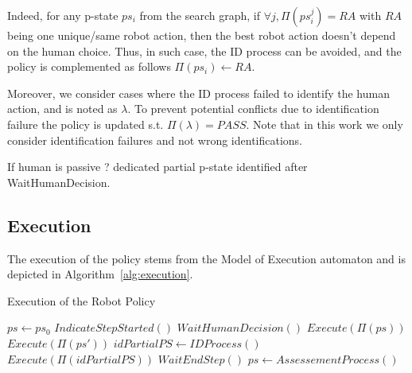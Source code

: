 Indeed, for any p-state $ps_i$ from the search graph, if $\forall j, \Pi(ps_i^j) = RA$ with $RA$ being one unique/same robot action, then the best robot action doesn't depend on the human choice. Thus, in such case, the ID process can be avoided, and the policy is complemented as follows $\Pi(ps_i) \gets RA$.

Moreover, we consider cases where the ID process failed to identify the human action, and is noted as $\lambda$. To prevent potential conflicts due to identification failure the policy is updated s.t. $\Pi(\lambda) = PASS$.
Note that in this work we only consider identification failures and not wrong identifications. 


If human is passive ? dedicated partial p-state identified after WaitHumanDecision.

    \subsection{Execution}

The execution of the policy stems from the Model of Execution automaton and is depicted in Algorithm~\ref{alg:execution}.

\begin{algorithm}
\caption{Execution of the Robot Policy }\label{alg:execution}
\begin{algorithmic}[1]

\State $ps \gets ps_0$ 
    \State $IndicateStepStarted()$ 
    \State $WaitHumanDecision()$
     
        \State $Execute(\Pi(ps))$
    \Else
         
            \State $Execute(\Pi(ps'))$
        \Else
            \State $idPartialPS \gets IDProcess()$ 
            \State $Execute(\Pi(idPartialPS))$
        \EndIf
    \EndIf
    \State $WaitEndStep()$ 
    \State $ps \gets AssessementProcess()$ 
\EndWhile

\end{algorithmic}
\end{algorithm}

